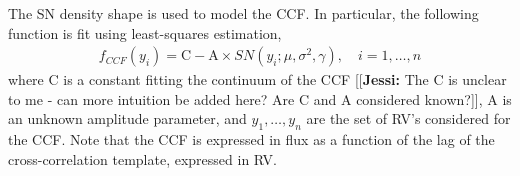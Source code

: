 \documentclass[11pt, oneside]{article}
\newcommand{\jessi}[1]{{\color{Purple}[[\textbf{Jessi: }#1]]}}
\begin{document}
The SN density shape is used to model the CCF.  In particular, the following function is fit using least-squares estimation,
%
\begin{eqnarray} \label{eq:3}
f_{CCF}(y_i) = \mathrm{C} - \mathrm{A} \times SN(y_i;\mu, \sigma^2, \gamma), \quad i = 1, \ldots, n
\end{eqnarray}
%
where C is a constant fitting the continuum of the CCF \jessi{The C is unclear to me - can more intuition be added here?  Are C and A considered known?}, A is an unknown amplitude parameter, and $y_1, \ldots, y_n$ are the set of RV's considered for the CCF. Note that the CCF is expressed in flux as a function of the lag of the cross-correlation template, expressed in RV.
\end{document}

